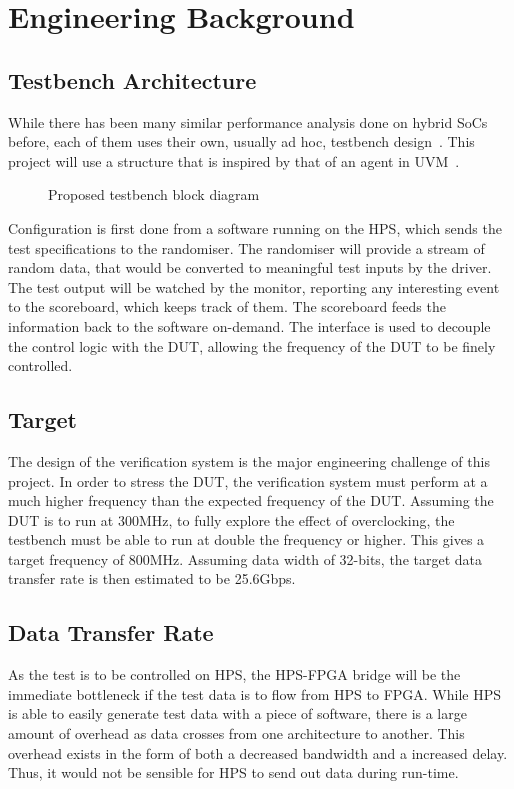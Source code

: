 \section{Engineering Background}

\subsection{Testbench Architecture}

While there has been many similar performance analysis done on hybrid SoCs
before, each of them uses their own, usually ad hoc, testbench
design~\cite{Shi1}.
This project will use a structure that is inspired by that of an agent in
UVM~\cite{Accellera1}.

\begin{figure}[H]
  \centering
  
  \caption{Proposed testbench block diagram}
  \label{Block}
\end{figure}

Configuration is first done from a software running on the HPS, which sends
the test specifications to the randomiser.
The randomiser will provide a stream of random data, that would be converted
to meaningful test inputs by the driver.
The test output will be watched by the monitor, reporting any interesting
event to the scoreboard, which keeps track of them.
The scoreboard feeds the information back to the software on-demand.
The interface is used to decouple the control logic with the DUT, allowing
the frequency of the DUT to be finely controlled.

\subsection{Target}
The design of the verification system is the major engineering challenge of this
project.
In order to stress the DUT, the verification system must perform at a much
higher frequency than the expected frequency of the DUT.
Assuming the DUT is to run at 300MHz, to fully explore the effect of
overclocking, the testbench must be able to run at double the frequency or
higher.
This gives a target frequency of 800MHz.
Assuming data width of 32-bits, the target data transfer rate is then 
estimated to be 25.6Gbps.

\subsection{Data Transfer Rate}
As the test is to be controlled on HPS, the HPS-FPGA bridge will be the
immediate bottleneck if the test data is to flow from HPS to FPGA.
While HPS is able to easily generate test data with a piece of software,
there is a large amount of overhead as data crosses from one architecture
to another.
This overhead exists in the form of both a decreased bandwidth and a increased
delay.
Thus, it would not be sensible for HPS to send out data during run-time.

